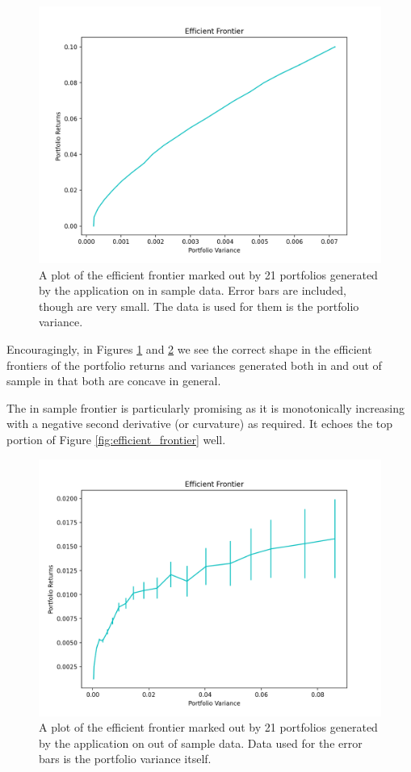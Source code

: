 \documentclass{article}
\begin{document}
\begin{figure}[H]
	\centerline{\includegraphics[width=\textwidth]{figures/is_ef.png}}
	\caption{A plot of the efficient frontier marked out by 21 portfolios generated by the application on in sample data. Error bars are included, though are very small. The data is used for them is the portfolio variance.}
	\label{fig:is_ef}
\end{figure}


Encouragingly, in Figures \ref{fig:is_ef} and \ref{fig:oos_ef} we see the correct shape in the efficient frontiers of the portfolio returns and variances generated both in and out of sample in that both are concave in general.

The in sample frontier is particularly promising as it is monotonically increasing with a negative second derivative (or curvature) as required. It echoes the top portion of Figure \ref{fig:efficient_frontier} well.



\begin{figure}[H]
	\centerline{\includegraphics[width=\textwidth]{figures/oos_ef.png}}
	\caption{A plot of the efficient frontier marked out by 21 portfolios generated by the application on out of sample data. Data used for the error bars is the portfolio variance itself.}
		\label{fig:oos_ef}
\end{figure}
\end{document}
